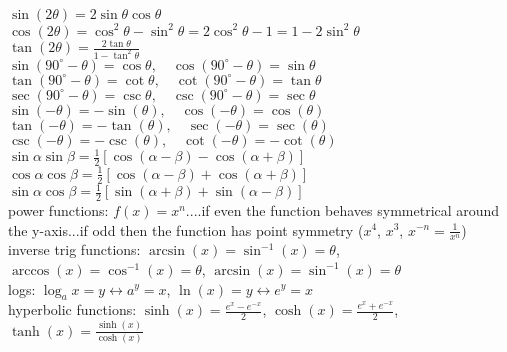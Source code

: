 \documentclass{article}
\begin{document}
$ \sin(2\theta) = 2\sin \theta \cos \theta $\\

$ \cos(2\theta) = \cos^2 \theta - \sin^2 \theta = 2\cos^2 \theta - 1 = 1 - 2\sin^2 \theta $\\

$ \tan(2\theta) = \frac{2\tan \theta}{1 - \tan^2 \theta} $\\

$ \sin(90^\circ - \theta) = \cos \theta, \quad \cos(90^\circ - \theta) = \sin \theta $\\

$ \tan(90^\circ - \theta) = \cot \theta, \quad \cot(90^\circ - \theta) = \tan \theta $\\

$ \sec(90^\circ - \theta) = \csc \theta, \quad \csc(90^\circ - \theta) = \sec \theta $\\

$ \sin(-\theta) = -\sin(\theta), \quad \cos(-\theta) = \cos(\theta) $\\

$ \tan(-\theta) = -\tan(\theta), \quad \sec(-\theta) = \sec(\theta) $\\

$ \csc(-\theta) = -\csc(\theta), \quad \cot(-\theta) = -\cot(\theta) $\\

$ \sin \alpha \sin \beta = \frac{1}{2} [\cos(\alpha - \beta) - \cos(\alpha + \beta)] $\\

$ \cos \alpha \cos \beta = \frac{1}{2} [\cos(\alpha - \beta) + \cos(\alpha + \beta)] $\\

$ \sin \alpha \cos \beta = \frac{1}{2} [\sin(\alpha + \beta) + \sin(\alpha - \beta)] $\\

power functions: $f(x) = x^n$....if even the function behaves symmetrical around the y-axis...if odd then the function has point symmetry ($x^4$, $x^3$, $x^{-n} = \frac{1}{x^n}$)\\

inverse trig functions: $\arcsin(x) = \sin^{-1}(x) = \theta$, $\arccos(x) = \cos^{-1}(x) = \theta$, $\arcsin(x) = \sin^{-1}(x) = \theta$\\

logs: $\log_ax=y \leftrightarrow a^y = x$, $\ln(x)=y \leftrightarrow e^y=x$\\

hyperbolic functions: $\sinh(x) = \frac{e^x-e^{-x}}{2}$, $\cosh(x) = \frac{e^x+e^{-x}}{2}$, $\tanh(x) = \frac{\sinh(x)}{\cosh(x)}$\\
\end{document}
